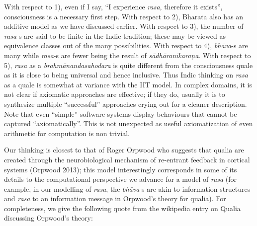 With respect to 1), even if I say, “I experience \textsl{rasa}, therefore it exists”, consciousness is a necessary first step. With respect to 2), Bharata also has an additive model as we have discussed earlier. With respect to 3), the number of \textsl{rasa}-s are said to be finite in the Indic tradition; these may be viewed as equivalence classes out of the many possibilities. With respect to 4), \textsl{bhāva}-s are many while \textsl{rasa}-s are fewer being the result of \textsl{sādhāranīkaraṇa}. With respect to 5), \textsl{rasa} as a \textsl{brahmānandasahodara} is quite different from the consciousness quale as it is close to being universal and hence inclusive. Thus Indic thinking on \textsl{rasa} as a quale is somewhat at variance with the IIT model. In complex domains, it is not clear if axiomatic approaches are effective; if they do, usually it is to synthesize multiple “successful” approaches crying out for a cleaner description. Note that even “simple” software systems display behaviours that cannot be captured “axiomatically”. This is not unexpected as useful axiomatization of even arithmetic for computation is non trivial.

Our thinking is closest to that of Roger Orpwood who suggests that qualia are created through the neurobiological mechanism of re-entrant feedback in cortical systems (Orpwood 2013); this model interestingly corresponds in some of its details to the computational perspective we advance for a model of \textsl{rasa} (for example, in our modelling of \textsl{rasa}, the \textsl{bhāva}-s are akin to information structures and \textsl{rasa} to an information message in Orpwood’s theory for qualia). For completeness, we give the following quote from the wikipedia entry on Qualia discussing Orpwood’s theory:

